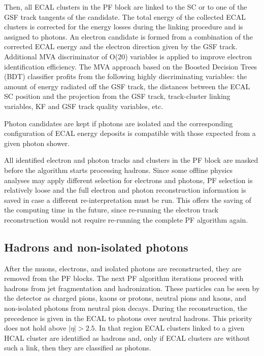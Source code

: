 \begin{small}
Then, all ECAL clusters in the PF block are linked to the SC or to one of the GSF track tangents of the candidate. The total energy of the collected ECAL clusters is corrected for the energy losses during the linking procedure and is assigned to photons. 
An electron candidate is formed from a combination of the corrected ECAL energy and the electron direction given by the GSF track. Additional MVA discriminator of O(20) variables is applied to improve electron identification efficiency. The MVA approach based on the Boosted Decision Trees (BDT) classifier \cite{TMVA} profits from the following highly discriminating variables: the amount of energy radiated off the GSF track, the distances between the ECAL SC position and the projection from the GSF track, track-cluster linking variables, KF and GSF track quality variables, etc. 

Photon candidates are kept if photons are isolated and the corresponding configuration of ECAL energy deposits is compatible with those expected from a given photon shower.  

All identified electron and photon tracks and clusters in the PF block are masked before the algorithm starts processing hadrons. 
Since some offline physics analyses may apply different selection for electrons and photons, PF selection is relatively loose and  the full electron and photon reconstruction information is saved in case a different re-interpretation must be run. This offers the saving of the computing time in the future, since re-running the electron track reconstruction would not require re-running the complete PF algorithm again.

\subsection{Hadrons and non-isolated photons}\label{sec:hadrons}

After the muons, electrons, and isolated photons are reconstructed, they are removed from the PF blocks. The next PF algorithm iterations proceed with hadrons from jet fragmentation and hadronization. These particles can be seen by the detector as charged pions, kaons or protons, neutral pions and kaons, and non-isolated photons from neutral pion decays. During the reconstruction, the precedence is given in the ECAL to photons over neutral hadrons. This priority does not hold above $|\eta| > 2.5$. In that region ECAL clusters linked to a given HCAL cluster are identified as hadrons and, only if ECAL clusters are without such a link, then they are classified as photons.  


\end{small}
